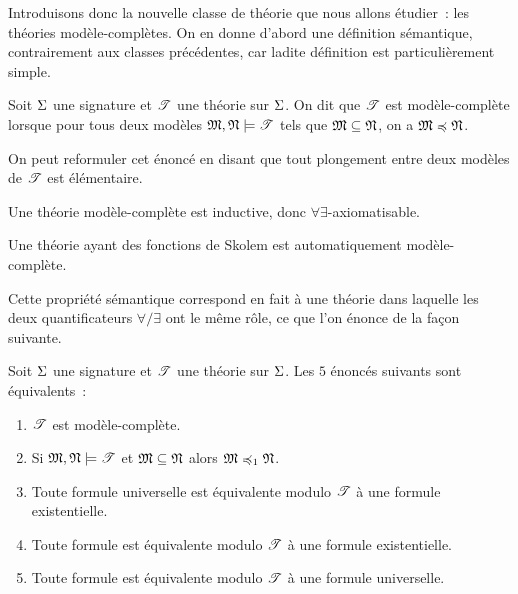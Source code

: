 Introduisons donc la nouvelle classe de théorie que nous allons étudier~: les
théories modèle-complètes. On en donne d'abord une définition sémantique,
contrairement aux classes précédentes, car ladite définition est
particulièrement simple.

\begin{definition}
  Soit $\Sigma$ une signature et $\mathscr T$ une théorie sur $\Sigma$. On dit que
  $\mathscr T$ est modèle-complète lorsque pour tous deux modèles
  $\mathfrak{M},\mathfrak{N}\models\mathscr T$ tels que $\mathfrak{M}\subseteq\mathfrak{N}$, on a
  $\mathfrak{M}\preccurlyeq\mathfrak{N}$.
\end{definition}

\begin{remark}
  On peut reformuler cet énoncé en disant que tout plongement entre deux modèles
  de $\mathscr T$ est élémentaire.
\end{remark}

\begin{remark}
  Une théorie modèle-complète est inductive, donc
  $\forall\exists$-axiomatisable.
\end{remark}

\begin{remark}
  Une théorie ayant des fonctions de Skolem est automatiquement modèle-complète.
\end{remark}

Cette propriété sémantique correspond en fait à une théorie dans laquelle les
deux quantificateurs $\forall/\exists$ ont le même rôle, ce que l'on énonce de
la façon suivante.

\begin{theorem}
  Soit $\Sigma$ une signature et $\mathscr T$ une théorie sur $\Sigma$. Les $5$ énoncés
  suivants sont équivalents~:
  \begin{enumerate}[label=(\roman*)]
  \item\label{item.modcpl1} $\mathscr T$ est modèle-complète.
  \item\label{item.modcpl2} Si $\mathfrak{M},\mathfrak{N}\models\mathscr T$ et
    $\mathfrak{M}\subseteq\mathfrak{N}$ alors $\mathfrak{M}\preccurlyeq_{1}\mathfrak{N}$.
  \item\label{item.modcpl3} Toute formule universelle est équivalente
    modulo $\mathscr T$ à une formule existentielle.
  \item\label{item.modcpl4} Toute formule est équivalente modulo $\mathscr T$ à
    une formule existentielle.
  \item\label{item.modcpl5} Toute formule est équivalente modulo $\mathscr T$ à
    une formule universelle.
  \end{enumerate}
\end{theorem}

